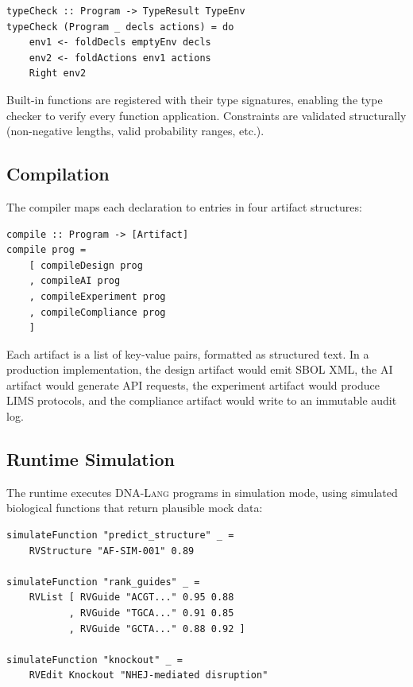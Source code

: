 \documentclass[12pt,a4paper]{article}
\newcommand{\DNALang}{\textsc{DNA-Lang}}
\begin{document}
\begin{lstlisting}[style=haskellstyle,caption={Type checker entry point.},label={lst:typechecker}]
typeCheck :: Program -> TypeResult TypeEnv
typeCheck (Program _ decls actions) = do
    env1 <- foldDecls emptyEnv decls
    env2 <- foldActions env1 actions
    Right env2
\end{lstlisting}

Built-in functions are registered with their type signatures, enabling the type checker to verify every function application. Constraints are validated structurally (non-negative lengths, valid probability ranges, etc.).

\subsection{Compilation}

The compiler maps each declaration to entries in four artifact structures:

\begin{lstlisting}[style=haskellstyle,caption={Compiler producing four artifacts.},label={lst:compiler}]
compile :: Program -> [Artifact]
compile prog =
    [ compileDesign prog
    , compileAI prog
    , compileExperiment prog
    , compileCompliance prog
    ]
\end{lstlisting}

Each artifact is a list of key-value pairs, formatted as structured text. In a production implementation, the design artifact would emit SBOL XML, the AI artifact would generate API requests, the experiment artifact would produce LIMS protocols, and the compliance artifact would write to an immutable audit log.

\subsection{Runtime Simulation}

The runtime executes \DNALang{} programs in simulation mode, using simulated biological functions that return plausible mock data:

\begin{lstlisting}[style=haskellstyle,caption={Simulated biological functions.},label={lst:runtime}]
simulateFunction "predict_structure" _ =
    RVStructure "AF-SIM-001" 0.89

simulateFunction "rank_guides" _ =
    RVList [ RVGuide "ACGT..." 0.95 0.88
           , RVGuide "TGCA..." 0.91 0.85
           , RVGuide "GCTA..." 0.88 0.92 ]

simulateFunction "knockout" _ =
    RVEdit Knockout "NHEJ-mediated disruption"
\end{lstlisting}
\end{document}
